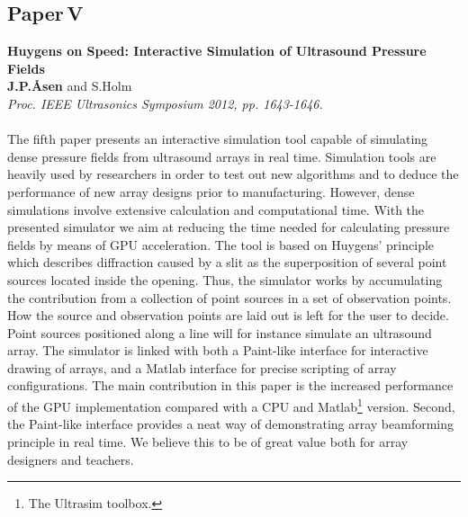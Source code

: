 \subsection{Paper\,V}
\textbf{Huygens on Speed: Interactive Simulation of Ultrasound Pressure Fields}\\
\textbf{J.\:P.\:\AA{}sen} and S.\:Holm\\
{\it Proc. IEEE Ultrasonics Symposium 2012, pp. 1643-1646.}\\\\
The fifth paper presents an interactive simulation tool capable of simulating dense pressure fields from ultrasound arrays in real time. Simulation tools are heavily used by researchers in order to test out new algorithms and to deduce the performance of new array designs prior to manufacturing. However, dense simulations involve extensive calculation and computational time. With the presented simulator we aim at reducing the time needed for calculating pressure fields by means of GPU acceleration. The tool is based on Huygens' principle which describes diffraction caused by a slit as the superposition of several point sources located inside the opening. Thus, the simulator works by accumulating the contribution from a collection of point sources in a set of observation points. How the source and observation points are laid out is left for the user to decide. Point sources positioned along a line will for instance simulate an ultrasound array. The simulator is linked with both a Paint-like interface for interactive drawing of arrays, and a Matlab interface for precise scripting of array configurations. The main contribution in this paper is the increased performance of the GPU implementation compared with a CPU and Matlab\footnote{The Ultrasim toolbox.} version. Second, the Paint-like interface provides a neat way of demonstrating array beamforming principle in real time. We believe this to be of great value both for array designers and teachers.

